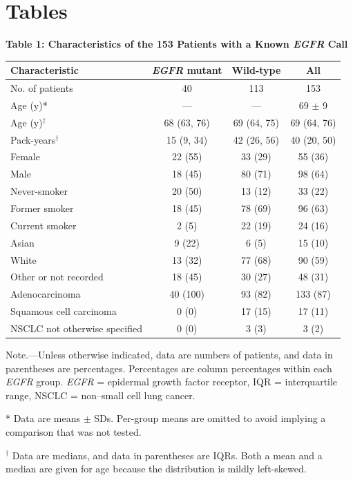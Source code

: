 \documentclass[11pt]{article}
\begin{document}
\section*{Tables}

\begin{table}[H]
\textbf{Table 1: Characteristics of the 153 Patients with a Known
\textit{EGFR} Call}

\medskip
\small
\begin{tabular}{lccc}
\toprule
Characteristic & \textit{EGFR} mutant & Wild-type & All \\
\midrule
No. of patients              & 40         & 113        & 153 \\
Age (y)*                     & ---        & ---        & 69 $\pm$ 9 \\
Age (y)$^\dagger$            & 68 (63, 76) & 69 (64, 75) & 69 (64, 76) \\
Pack-years$^\dagger$         & 15 (9, 34)  & 42 (26, 56) & 40 (20, 50) \\
\midrule
Female                       & 22 (55)  & 33 (29)  & 55 (36) \\
Male                         & 18 (45)  & 80 (71)  & 98 (64) \\
\midrule
Never-smoker                 & 20 (50)  & 13 (12)  & 33 (22) \\
Former smoker                & 18 (45)  & 78 (69)  & 96 (63) \\
Current smoker               & 2 (5)    & 22 (19)  & 24 (16) \\
\midrule
Asian                        & 9 (22)   & 6 (5)    & 15 (10) \\
White                        & 13 (32)  & 77 (68)  & 90 (59) \\
Other or not recorded        & 18 (45)  & 30 (27)  & 48 (31) \\
\midrule
Adenocarcinoma               & 40 (100) & 93 (82)  & 133 (87) \\
Squamous cell carcinoma      & 0 (0)    & 17 (15)  & 17 (11) \\
NSCLC not otherwise specified & 0 (0)   & 3 (3)    & 3 (2) \\
\bottomrule
\end{tabular}

\medskip
\footnotesize
Note.---Unless otherwise indicated, data are numbers of patients, and data in
parentheses are percentages. Percentages are column percentages within each
\textit{EGFR} group. \textit{EGFR} = epidermal growth factor receptor,
IQR = interquartile range, NSCLC = non--small cell lung cancer.

\smallskip
* Data are means $\pm$ SDs. Per-group means are omitted to avoid implying a
comparison that was not tested.

$^\dagger$ Data are medians, and data in parentheses are IQRs. Both a mean and a
median are given for age because the distribution is mildly left-skewed.
\end{table}
\end{document}
